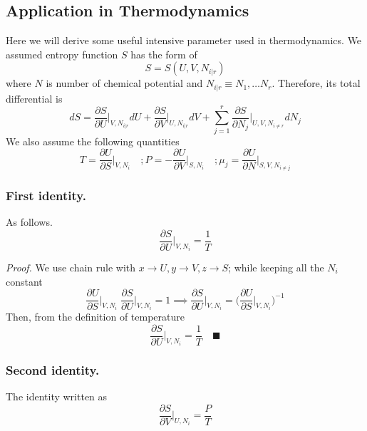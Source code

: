 \documentclass[../../Main.tex]{subfiles}
\begin{document}
\subsection*{Application in Thermodynamics}
Here we will derive some useful intensive parameter used in thermodynamics. We assumed entropy function $S$ has the form of 
\begin{equation*}
    S=S(U, V, N_{i|r} )
\end{equation*}
where $N$ is number of chemical potential and $N_{i|r}\equiv N_1,\dots N_r$. Therefore, its total differential is 
\begin{equation*}
    dS=\frac{\partial S}{\partial U}\bigg|_{V, N_{i|r} }dU + \frac{\partial S}{ \partial V}\bigg|_{U, N_{i|r} }dV +\sum_{j=1}^{r}\frac{\partial S}{ \partial N_j}\bigg|_{U,V, N_{i\neq r} }dN_j
\end{equation*}
We also assume the following quantities
\begin{equation*}
    T=\frac{\partial U}{\partial S}\bigg|_{V, N_{i} }\quad
    ;P=-\frac{\partial U}{\partial V}\bigg|_{S, N_{i} }\quad
    ;\mu_j=\frac{\partial U}{\partial N}\bigg|_{S, V, N_{i\neq j} }
\end{equation*}

\subsubsection*{First identity.} As follows.
\begin{equation*}
    \frac{\partial S}{\partial U}\bigg|_{V, N_i}=\frac{1}{T}
\end{equation*}

\emph{Proof.} We use chain rule with $x\rightarrow U,  y \rightarrow V ,z \rightarrow S$; while keeping all the $N_i$ constant
\begin{equation*}
    \frac{\partial U}{\partial S}\bigg|_{V,N_i}\;\frac{\partial S}{\partial U}\bigg|_{V,N_i}=1\implies
    \frac{\partial S}{\partial U}\bigg|_{V,N_i}=\biggl(\frac{\partial U}{\partial S}\bigg|_{V,N_i}\biggr)^{-1}
\end{equation*}
Then, from the definition of temperature
\begin{equation*}
    \frac{\partial S}{\partial U}\bigg|_{V,N_i}=\frac{1}{T}\quad \blacksquare
\end{equation*}

\subsubsection*{Second identity.} The identity written as
\begin{equation*}
    \frac{\partial S}{\partial V}\bigg|_{U, N_i}=\frac{P}{T}
\end{equation*}
\end{document}
